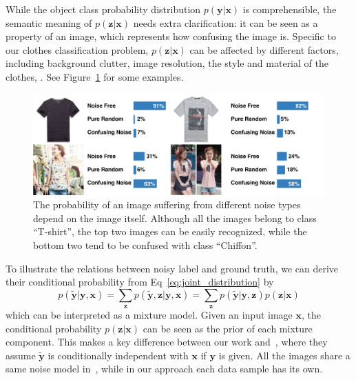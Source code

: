 \documentclass[10pt,twocolumn,letterpaper]{article}
\def\vec{\mathbf}
\begin{document}
While the object class probability distribution $p(\vec{y} | \vec{x})$ is comprehensible, the semantic meaning of $p(\vec{z} | \vec{x})$ needs extra clarification: it can be seen as a property of an image, which represents how confusing the image is. Specific to our clothes classification problem, $p(\vec{z} | \vec{x})$ can be affected by different factors, including background clutter, image resolution, the style and material of the clothes, \etc. See Figure~\ref{fig:compare_noise_level} for some examples.

\begin{figure}[t]
\begin{center}
\includegraphics[width=1.0\linewidth]{figure/noise_level.pdf}
\end{center}
\caption{The probability of an image suffering from different noise types depend on the image itself. Although all the images belong to class ``T-shirt'', the top two images can be easily recognized, while the bottom two tend to be confused with class ``Chiffon''.}
\label{fig:compare_noise_level}
\end{figure}

To illustrate the relations between noisy label and ground truth, we can derive their conditional probability from Eq~\ref{eq:joint_distribution} by
\begin{equation}
    p(\tilde{\vec{y}} | \vec{y}, \vec{x}) = \sum_{\vec{z}} p(\tilde{\vec{y}}, \vec{z} | \vec{y}, \vec{x}) = \sum_{\vec{z}} p(\tilde{\vec{y}} | \vec{y}, \vec{z}) p(\vec{z} | \vec{x})
\end{equation}
which can be interpreted as a mixture model. Given an input image $\vec{x}$, the conditional probability $p(\vec{z} | \vec{x})$ can be seen as the prior of each mixture component. This makes a key difference between our work and~\cite{sukhbaatar2014learning}, where they assume $\tilde{\vec{y}}$ is conditionally independent with $\vec{x}$ if $\vec{y}$ is given. All the images share a same noise model in~\cite{sukhbaatar2014learning}, while in our approach each data sample has its own.
\end{document}
